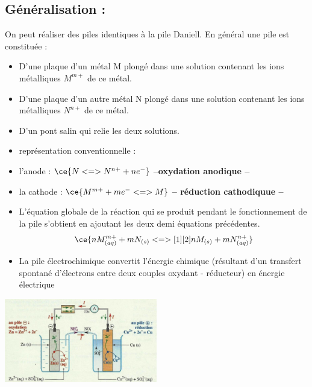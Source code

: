 \documentclass[12pt]{article}
\begin{document}
\subsection{Généralisation :}
On peut réaliser des piles identiques à la pile Daniell.
En général une pile est constituée :
\begin{itemize}
	\item D'une plaque d'un métal M plongé dans une solution contenant les ions métalliques $M^{m+}$ de ce métal.
	\item D'une plaque d'un autre métal N plongé dans une solution contenant les ions métalliques $N^{n+}$ de ce métal.
\item D'un pont salin qui relie les deux solutions.
\item représentation conventionnelle : 
\begin{center}

\end{center}

\item l'anode :     $\ce{N <=> N^{n+} + ne^-}$  \textbf{	--oxydation anodique --}
\item la cathode :  $\ce{M^{m+}  + me^- <=> M}$  \textbf{-- réduction cathodiquue -- }

	\item L'équation globale de la réaction qui se produit pendant le fonctionnement de la pile s'obtient en ajoutant les deux demi équations précédentes. $$\ce{nM^{m+}_{(aq)}  + mN_{(s)} <=>[1][2] nM_{(s)} + mN^{n+}_{(aq)}}$$

	\item La pile électrochimique convertit l'énergie chimique (résultant d'un transfert spontané d'électrons entre deux couples oxydant -
réducteur) en énergie électrique

\end{itemize}

\begin{center}

	\includegraphics[width=0.5\textwidth]{./piles.png}

\end{center}
\end{document}
